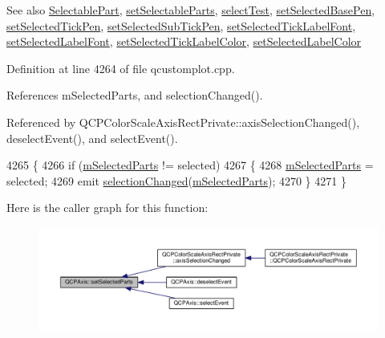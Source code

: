 \begin{DoxySeeAlso}{See also}
\hyperlink{class_q_c_p_axis_abee4c7a54c468b1385dfce2c898b115f}{Selectable\+Part}, \hyperlink{class_q_c_p_axis_a513f9b9e326c505d9bec54880031b085}{set\+Selectable\+Parts}, \hyperlink{class_q_c_p_axis_a2877a6230920c118be65c6113089f467}{select\+Test}, \hyperlink{class_q_c_p_axis_aeb917a909215605b95ef2be843de1ee8}{set\+Selected\+Base\+Pen}, \hyperlink{class_q_c_p_axis_a8360502685eb782edbf04019c9345cdc}{set\+Selected\+Tick\+Pen}, \hyperlink{class_q_c_p_axis_a2a00a7166600155eac26843132eb9576}{set\+Selected\+Sub\+Tick\+Pen}, \hyperlink{class_q_c_p_axis_a845ccb560b7bc5281098a5be494145f6}{set\+Selected\+Tick\+Label\+Font}, \hyperlink{class_q_c_p_axis_a02ec2a75d4d8401eaab834fbc6803d30}{set\+Selected\+Label\+Font}, \hyperlink{class_q_c_p_axis_a9bdbf5e63ab15187f3a1de9440129227}{set\+Selected\+Tick\+Label\+Color}, \hyperlink{class_q_c_p_axis_a5d502dec597c634f491fdd73d151c72d}{set\+Selected\+Label\+Color} 
\end{DoxySeeAlso}


Definition at line 4264 of file qcustomplot.\+cpp.



References m\+Selected\+Parts, and selection\+Changed().



Referenced by Q\+C\+P\+Color\+Scale\+Axis\+Rect\+Private\+::axis\+Selection\+Changed(), deselect\+Event(), and select\+Event().


\begin{DoxyCode}
4265 \{
4266   \textcolor{keywordflow}{if} (\hyperlink{class_q_c_p_axis_a8f1eb0abfe2ae64652aa46b360e841e4}{mSelectedParts} != selected)
4267   \{
4268     \hyperlink{class_q_c_p_axis_a8f1eb0abfe2ae64652aa46b360e841e4}{mSelectedParts} = selected;
4269     emit \hyperlink{class_q_c_p_axis_a62b598abeee7174a05f9d542cc85b1f5}{selectionChanged}(\hyperlink{class_q_c_p_axis_a8f1eb0abfe2ae64652aa46b360e841e4}{mSelectedParts});
4270   \}
4271 \}
\end{DoxyCode}


Here is the caller graph for this function\+:\nopagebreak
\begin{figure}[H]
\begin{center}
\leavevmode
\includegraphics[width=350pt]{class_q_c_p_axis_ab9d7a69277dcbed9119b3c1f25ca19c3_icgraph}
\end{center}
\end{figure}


